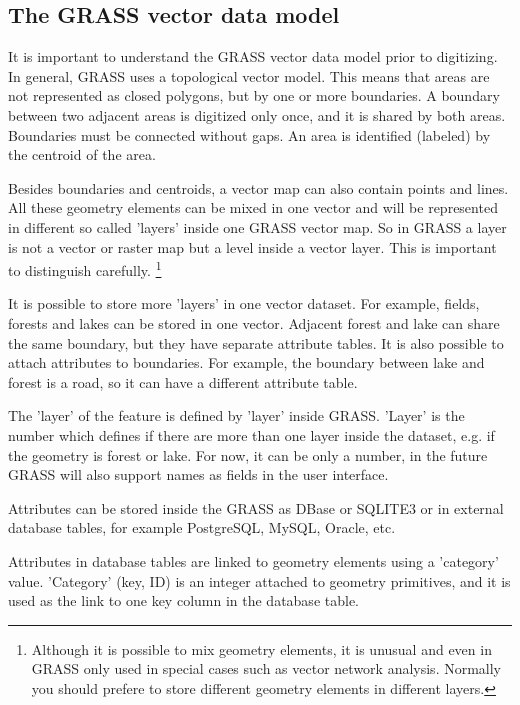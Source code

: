 \subsection{The GRASS vector data model}\label{label_vectmodel}

It is important to understand the GRASS vector data model prior to
digitizing. In general, GRASS uses a topological
vector model. This means that areas are not represented
as closed polygons, but by one or more boundaries. A boundary between two
adjacent areas is digitized only once, and it is shared by both areas.
Boundaries must be connected without gaps. An area is identified (labeled) 
by the centroid of the area.

Besides boundaries and centroids, a vector map can also contain
points and lines. All these geometry elements can be mixed
in one vector and will be represented in different so called 'layers' inside
one GRASS vector map. So in GRASS a layer is not a vector or raster map but a
level inside a vector layer. This is important to distinguish carefully.
\footnote{Although it
is possible to mix geometry elements, it is unusual and even in GRASS only
used in special cases such as vector network analysis. Normally you should
prefere to store different geometry elements in different layers.}

It is possible to store more 'layers' in one vector dataset. For example,
fields, forests and lakes can be stored in one vector. Adjacent
forest and lake can share the same boundary, but they have separate attribute
tables. It is also possible to attach attributes to boundaries. For example,
the boundary between lake and forest is a road, so it can have a different 
attribute table.
 
The 'layer' of the feature is defined by 'layer' inside GRASS. 'Layer' is the 
number which defines if there are more than one layer inside the dataset, e.g. 
if the geometry is forest or lake. For now, it can be only a number, in the 
future GRASS will also support names as fields in the user interface.

Attributes can be stored inside the GRASS  as DBase or 
SQLITE3 or in external database tables, for example PostgreSQL, MySQL, 
Oracle, etc.

Attributes in database tables are linked to geometry elements using
a 'category' value. 'Category' (key, ID) is an
integer attached to geometry primitives, and it is used as the link to one
key column in the database table.

